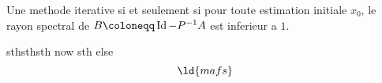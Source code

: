 \documentclass[../main.tex]{subfiles}
\begin{document}
\begin{thm}
	Une methode iterative si et seulement si pour toute estimation initiale $x_0$, le rayon spectral de $B \coloneqq \id - P^{-1}A$ est inferieur a $1$.
\end{thm}
sthsthsth
now sth else
\[
  \ld{mafs}
\] 
\end{document}
